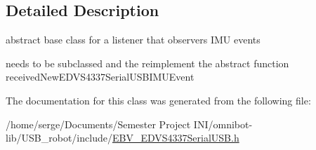 \subsection{Detailed Description}
abstract base class for a listener that observers I\+M\+U events 

needs to be subclassed and the reimplement the abstract function received\+New\+E\+D\+V\+S4337\+Serial\+U\+S\+B\+I\+M\+U\+Event 

The documentation for this class was generated from the following file\+:\begin{DoxyCompactItemize}
\item 
/home/serge/\+Documents/\+Semester Project I\+N\+I/omnibot-\/lib/\+U\+S\+B\+\_\+robot/include/\hyperlink{_e_b_v___e_d_v_s4337_serial_u_s_b_8h}{E\+B\+V\+\_\+\+E\+D\+V\+S4337\+Serial\+U\+S\+B.\+h}\end{DoxyCompactItemize}
